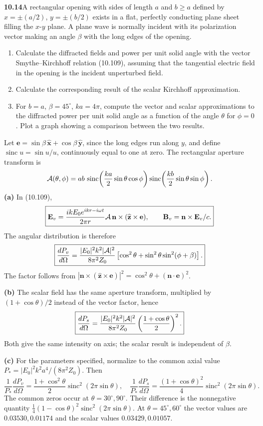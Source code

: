 \par\bigskip
\noindent\textbf{10.14}\quad A rectangular opening with sides of length $a$ and $b\geq a$ defined by $x=\pm(a/2)$, $y=\pm(b/2)$ exists in a flat, perfectly conducting plane sheet filling the $x$-$y$ plane. A plane wave is normally incident with its polarization vector making an angle $\beta$ with the long edges of the opening.
\begin{enumerate}
\item[(a)] Calculate the diffracted fields and power per unit solid angle with the vector Smythe--Kirchhoff relation (10.109), assuming that the tangential electric field in the opening is the incident unperturbed field.
\item[(b)] Calculate the corresponding result of the scalar Kirchhoff approximation.
\item[(c)] For $b=a$, $\beta=45^{\circ}$, $ka=4\pi$, compute the vector and scalar approximations to the diffracted power per unit solid angle as a function of the angle $\theta$ for $\phi=0$. Plot a graph showing a comparison between the two results.
\end{enumerate}
\solution
Let $\mathbf e=\sin\beta\,\widehat{\mathbf x}
+\cos\beta\,\widehat{\mathbf y}$, since the long edges run along $y$,
and define $\operatorname{sinc}u=\sin u/u$, continuously equal to one
at zero. The rectangular aperture transform is
\[
{\cal A}(\theta,\phi)=ab\,
\operatorname{sinc}\!\left(\frac{ka}{2}\sin\theta\cos\phi\right)
\operatorname{sinc}\!\left(\frac{kb}{2}\sin\theta\sin\phi\right).
\]
\textbf{(a)} In (10.109),
\[
\boxed{\mathbf E_v=\frac{ikE_0e^{ikr-i\omega t}}{2\pi r}
{\cal A}\,\mathbf n\times(\widehat{\mathbf z}\times\mathbf e),
\qquad \mathbf B_v=\mathbf n\times\mathbf E_v/c.}
\]
The angular distribution is therefore
\[
\boxed{\frac{dP_v}{d\Omega}
=\frac{|E_0|^2 k^2|{\cal A}|^2}{8\pi^2Z_0}
\left[\cos^2\theta+\sin^2\theta\sin^2(\phi+\beta)\right].}
\]
The factor follows from
$|\mathbf n\times(\widehat{\mathbf z}\times\mathbf e)|^2
=\cos^2\theta+(\mathbf n\cdot\mathbf e)^2$.

\textbf{(b)} The scalar field has the same aperture transform, multiplied
by $(1+\cos\theta)/2$ instead of the vector factor, hence
\[
\boxed{\frac{dP_s}{d\Omega}
=\frac{|E_0|^2 k^2|{\cal A}|^2}{8\pi^2Z_0}
\left(\frac{1+\cos\theta}{2}\right)^2.}
\]
Both give the same intensity on axis; the scalar result is independent
of $\beta$.

\textbf{(c)} For the parameters specified, normalize to the common axial
value $P_* = |E_0|^2 k^2a^4/(8\pi^2Z_0)$. Then
\[
\boxed{\frac1{P_*}\frac{dP_v}{d\Omega}
=\frac{1+\cos^2\theta}{2}\operatorname{sinc}^2(2\pi\sin\theta),
\quad
\frac1{P_*}\frac{dP_s}{d\Omega}
=\frac{(1+\cos\theta)^2}{4}\operatorname{sinc}^2(2\pi\sin\theta).}
\]
The common zeros occur at $\theta=30^\circ,90^\circ$.
Their difference is the nonnegative quantity
$\tfrac14(1-\cos\theta)^2\operatorname{sinc}^2(2\pi\sin\theta)$.
At $\theta=45^\circ,60^\circ$ the vector values are
$0.03530,0.01174$ and the scalar values $0.03429,0.01057$.
\begin{center}\end{center}

